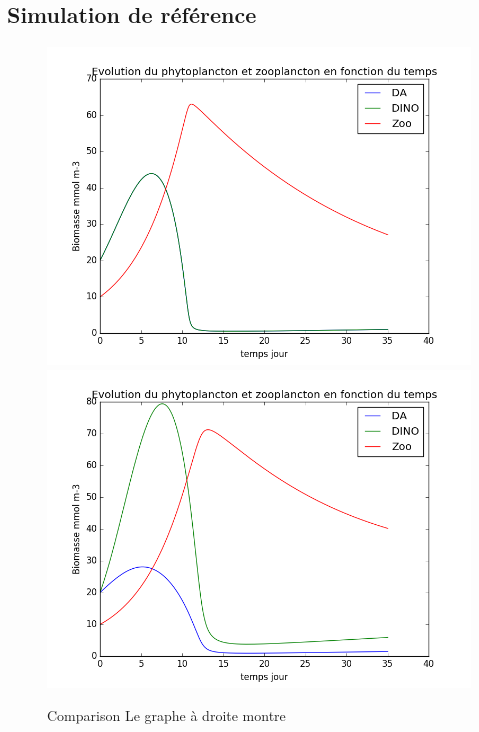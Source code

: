 \subsection{Simulation de référence}

\begin{figure}
  \includegraphics[width=.5\textwidth]{partie2/1Nonselec.png}\hfill
  \includegraphics[width=.5\textwidth]{partie2/1Selec.png}
  \caption{Comparison 
Le graphe à droite montre \todo}
  \label{fig:partie2Ref}
\end{figure}

